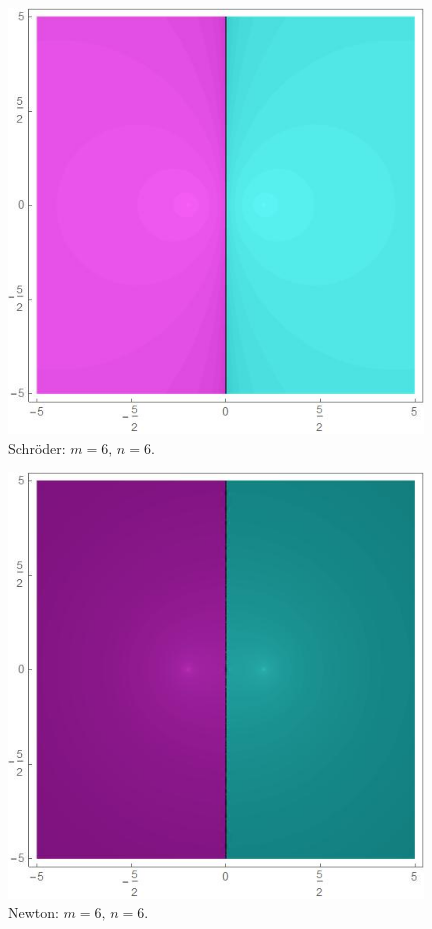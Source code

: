 \begin{figure}[H]
\centering 
\begin{minipage}[t]{0.45\textwidth}
\centering
\includegraphics[width=0.98\textwidth]{fuentes/articulo-cuadraticos/imagenes/sch_n_6_m_6.jpg}
\small Schröder: $m=6, \, n=6.$
\end{minipage}\hfill
\begin{minipage}[t]{0.45\textwidth}
\centering
\includegraphics[width=0.98\textwidth]{fuentes/articulo-cuadraticos/imagenes/newton_n_6_m_6.jpg}
\small Newton: $m=6, \, n=6.$
\end{minipage}


\end{figure}
